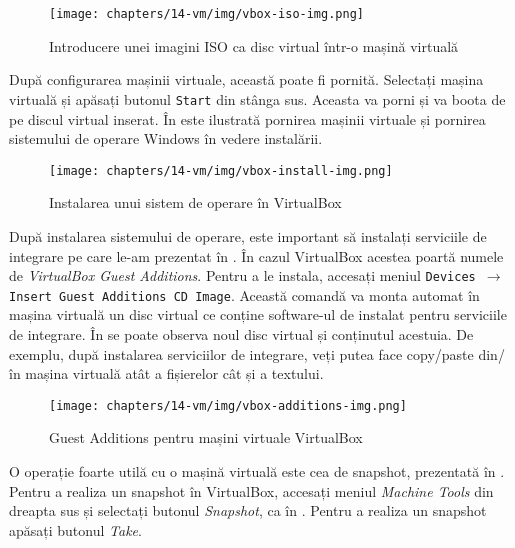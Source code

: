 \begin{figure}[!htbp]
	\centering
	\texttt{[image: chapters/14-vm/img/vbox-iso-img.png]}
	\caption{Introducere unei imagini ISO ca disc virtual într-o mașină virtuală}
	\label{fig:vm:vbox-iso}
\end{figure}

După configurarea mașinii virtuale, această poate fi pornită. Selectați mașina
virtuală și apăsați butonul \texttt{Start} din stânga sus. Aceasta va porni și va boota
de pe discul virtual inserat. În
 este ilustrată pornirea mașinii
virtuale și pornirea sistemului de operare Windows în vedere instalării.

\begin{figure}[!htbp]
	\centering
	\texttt{[image: chapters/14-vm/img/vbox-install-img.png]}
	\caption{Instalarea unui sistem de operare în VirtualBox}
	\label{fig:vm:vbox-install}
\end{figure}

După instalarea sistemului de operare, este important să instalați serviciile de
integrare pe care le-am prezentat în .
În cazul VirtualBox acestea poartă numele de \textit{VirtualBox Guest Additions}. Pentru a le instala, accesați meniul \texttt{Devices $\rightarrow$ Insert Guest
Additions CD Image}. Această comandă va monta automat în mașina virtuală un disc
virtual ce conține software-ul de instalat pentru serviciile de integrare. În
 se poate observa noul disc virtual
și conținutul acestuia. De exemplu, după instalarea serviciilor de integrare,
veți putea face copy/paste din/în mașina virtuală atât a fișierelor cât și a
textului.

\begin{figure}[!htbp]
	\centering
	\texttt{[image: chapters/14-vm/img/vbox-additions-img.png]}
	\caption{Guest Additions pentru mașini virtuale VirtualBox}
	\label{fig:vm:vbox-additions}
\end{figure}

O operație foarte utilă cu o mașină virtuală este cea de snapshot, prezentată
în . Pentru a realiza un snapshot în
VirtualBox, accesați meniul \textit{Machine Tools} din dreapta sus și
selectați butonul \textit{Snapshot}, ca în
. Pentru a realiza un snapshot
apăsați butonul \textit{Take}.

